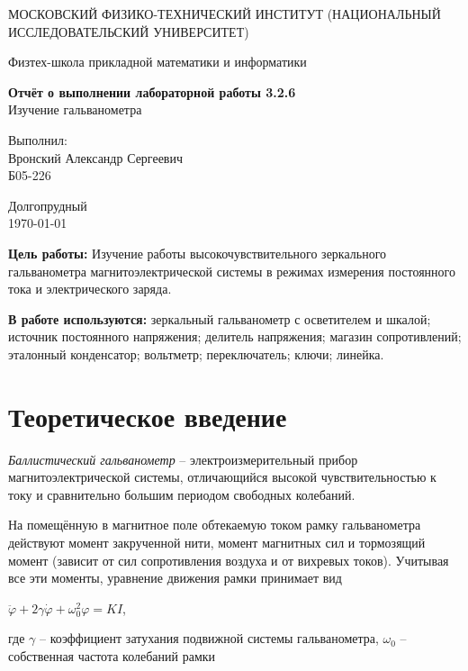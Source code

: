 \documentclass[a4paper,12pt]{article}
\date{\today}
\begin{document}
\begin{titlepage}
	\begin{center}
		{\large МОСКОВСКИЙ ФИЗИКО-ТЕХНИЧЕСКИЙ ИНСТИТУТ (НАЦИОНАЛЬНЫЙ ИССЛЕДОВАТЕЛЬСКИЙ УНИВЕРСИТЕТ)}
	\end{center}
	\begin{center}
		{\large Физтех-школа прикладной математики и информатики}
	\end{center}


	\vspace{4.5cm}
	{\huge
		\begin{center}
			{\bf Отчёт о выполнении лабораторной работы 3.2.6}\\
      Изучение гальванометра
		\end{center}
	}
	\vspace{2cm}
	\begin{flushright}
		{\LARGE Выполнил:\\ Вронский Александр Сергеевич \\
			\vspace{0.2cm}
			Б05-226}
	\end{flushright}
	\vspace{8cm}
	\begin{center}
		Долгопрудный\\
		\today
	\end{center}
\end{titlepage}

\textbf{Цель работы:} Изучение работы высокочувствительного зеркального гальванометра магнитоэлектрической системы в режимах измерения постоянного тока и электрического заряда.

\textbf{В работе используются:} зеркальный гальванометр с осветителем и шкалой; источник постоянного напряжения; делитель напряжения; магазин сопротивлений; эталонный конденсатор; вольтметр; переключатель; ключи; линейка.

\section{Теоретическое введение}

  \textit{Баллистический гальванометр} -- электроизмерительный прибор магнитоэлектрической системы, отличающийся высокой чувствительностью к току и сравнительно большим периодом свободных колебаний. \par
  На помещённую в магнитное поле обтекаемую током рамку гальванометра действуют момент закрученной нити, момент магнитных сил и тормозящий момент (зависит от сил сопротивления воздуха и от вихревых токов). Учитывая все эти моменты, уравнение движения рамки принимает вид
  \begin{center}
      $\ddot \varphi + 2 \gamma \dot \varphi + \omega_0^2\varphi = KI $,
  \end{center}
  где $\gamma$ -- коэффициент затухания подвижной системы гальванометра, $\omega_0$ -- собственная частота колебаний рамки
\end{document}
